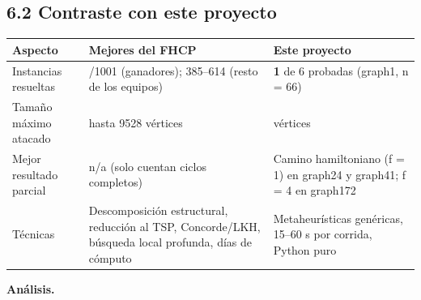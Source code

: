 \documentclass[
  spanish,
  12pt,
]{article}
\newcounter{none} %
\begin{document}
\subsection{6.2 Contraste con este
proyecto}\label{contraste-con-este-proyecto}

{\def\LTcaptype{none} %
\begin{longtable}[]{@{}
  >{\raggedright\arraybackslash}p{}
  >{\raggedright\arraybackslash}p{}
  >{\raggedright\arraybackslash}p{}@{}}
\toprule\noalign{}
\begin{minipage}[b]{\linewidth}\raggedright
Aspecto
\end{minipage} & \begin{minipage}[b]{\linewidth}\raggedright
Mejores del FHCP
\end{minipage} & \begin{minipage}[b]{\linewidth}\raggedright
Este proyecto
\end{minipage} \\
\midrule\noalign{}
\endhead
\bottomrule\noalign{}
\endlastfoot
Instancias resueltas & 985/1001 (ganadores); 385--614 (resto de los
equipos) & \textbf{1} de 6 probadas (graph1, n = 66) \\
Tamaño máximo atacado & hasta 9528 vértices & 3468 vértices \\
Mejor resultado parcial & n/a (solo cuentan ciclos completos) & Camino
hamiltoniano (f = 1) en graph24 y graph41; f = 4 en graph172 \\
Técnicas & Descomposición estructural, reducción al TSP, Concorde/LKH,
búsqueda local profunda, días de cómputo & Metaheurísticas genéricas,
15--60 s por corrida, Python puro \\
\end{longtable}
}

\textbf{Análisis.}
\end{document}
